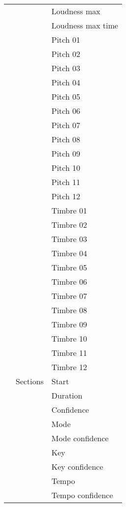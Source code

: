 \begin{center}
\begin{longtable}{ p{} p{} p{} }
& & Loudness max \\ \cmidrule(r){3-3}
& & Loudness max time \\ \cmidrule(r){3-3}
& & Pitch 01 \\ \cmidrule(r){3-3}
& & Pitch 02 \\ \cmidrule(r){3-3}
& & Pitch 03 \\ \cmidrule(r){3-3}
& & Pitch 04 \\ \cmidrule(r){3-3}
& & Pitch 05 \\ \cmidrule(r){3-3}
& & Pitch 06 \\ \cmidrule(r){3-3}
& & Pitch 07 \\ \cmidrule(r){3-3}
& & Pitch 08 \\ \cmidrule(r){3-3}
& & Pitch 09 \\ \cmidrule(r){3-3}
& & Pitch 10 \\ \cmidrule(r){3-3}
& & Pitch 11 \\ \cmidrule(r){3-3}
& & Pitch 12 \\ \cmidrule(r){3-3}
& & Timbre 01 \\ \cmidrule(r){3-3}
& & Timbre 02 \\ \cmidrule(r){3-3}
& & Timbre 03 \\ \cmidrule(r){3-3}
& & Timbre 04 \\ \cmidrule(r){3-3}
& & Timbre 05 \\ \cmidrule(r){3-3}
& & Timbre 06 \\ \cmidrule(r){3-3}
& & Timbre 07 \\ \cmidrule(r){3-3}
& & Timbre 08 \\ \cmidrule(r){3-3}
& & Timbre 09 \\ \cmidrule(r){3-3}
& & Timbre 10 \\ \cmidrule(r){3-3}
& & Timbre 11 \\ \cmidrule(r){3-3}
& & Timbre 12 \\ \cmidrule(r){2-3}
& Sections & Start \\ \cmidrule(r){3-3}
& & Duration \\ \cmidrule(r){3-3}
& & Confidence \\ \cmidrule(r){3-3}
& & Mode \\ \cmidrule(r){3-3}
& & Mode confidence \\ \cmidrule(r){3-3}
& & Key \\ \cmidrule(r){3-3}
& & Key confidence \\ \cmidrule(r){3-3}
& & Tempo \\ \cmidrule(r){3-3}
& & Tempo confidence \\ \cmidrule(r){3-3}

\end{longtable}
\end{center}

